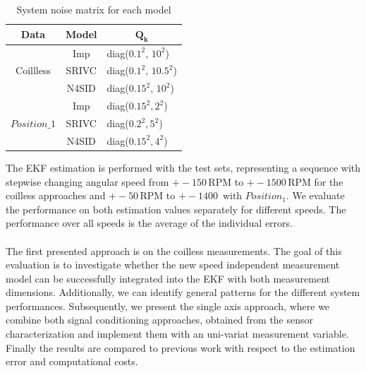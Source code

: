 \documentclass[english]{isasthesis}
\begin{document}
	\begin{table}[t]
	\centering
	\begin{tabular}{|c|c|c|}
	\hline
	\textbf{Data}                    & \textbf{Model} & $\mathbf{Q_k}$ \\ \hline
	\multirow{3}{*}{Coillless}       & Imp            & \multicolumn{1}{|l|}{diag($0.1^2$, $10^2$)}            \\ \cline{2-3} 
	                                 & SRIVC          &  \multicolumn{1}{|l|}{diag($0.1^2$, $10.5^2$)}            \\ \cline{2-3} 
	                                 & N4SID          &  \multicolumn{1}{|l|}{diag($0.15^2$, $10^2$)}            \\ \hline
	\multirow{3}{*}{$Position\_1$} & Imp            &  \multicolumn{1}{|l|}{diag($0.15^2, 2^2$)}            \\ \cline{2-3} 
	                                 & SRIVC          &  \multicolumn{1}{|l|}{diag($0.2^2, 5^2$)}             \\ \cline{2-3} 
	                                 & N4SID          &  \multicolumn{1}{|l|}{diag($0.15^2, 4^2$)}              \\ \hline
	\end{tabular}
	\caption{System noise matrix for each model}
	\label{table:sys noise}
	\end{table}
		The EKF estimation is performed with the test sets, representing a sequence with stepwise changing angular speed from $+-150\,$RPM to $+-1500\,$RPM for the coilless approaches and $+-50\,$RPM to $+-1400\,$ with $Position_1$. We evaluate the performance on both estimation values separately for different speeds. The performance over all speeds is the average of the individual errors.\\\\
  		The first presented approach is on the coilless measurements. The goal of this evaluation is to investigate whether the new speed independent measurement model can be successfully integrated into the EKF with both measurement dimensions. Additionally, we can identify general patterns for the different system performances. Subsequently, we present the single axis approach, where we combine both signal conditioning approaches, obtained from the sensor characterization and implement them with an uni-variat measurement variable. Finally the results are compared to previous work with respect to the estimation error and computational costs.	
\end{document}

